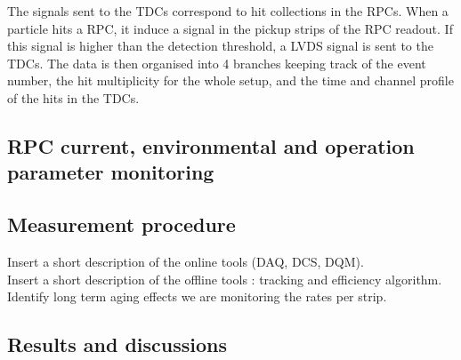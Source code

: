 	The signals sent to the TDCs correspond to hit collections in the RPCs. When a particle hits a RPC, it induce a signal in the pickup strips of the RPC readout. If this signal is higher than the detection threshold, a LVDS signal is sent to the TDCs. The data is then organised into 4 branches keeping track of the event number, the hit multiplicity for the whole setup, and the time and channel profile of the hits in the TDCs.
	
	\subsection{RPC current, environmental and operation parameter monitoring}
	\label{chapt5:ssec:GIF++DCS}
            
	

	\subsection{Measurement procedure}
	\label{chapt5:ssec:GIF++Proc}

	Insert a short description of the online tools (DAQ, DCS, DQM).\\
	Insert a short description of the offline tools : tracking and efficiency algorithm.\\
	Identify long term aging effects we are monitoring the rates per strip.
	
	\subsection{Results and discussions}
	\label{chapt5:ssec:resultsGIFpp}
    
